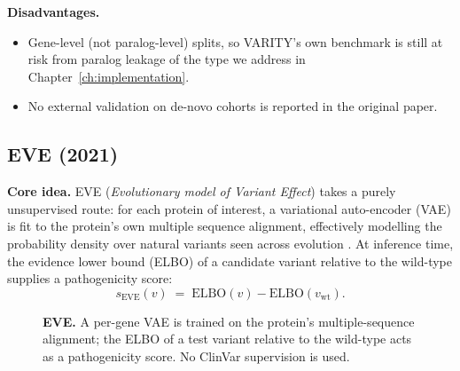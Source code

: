 \documentclass[11pt,a4paper,oneside]{report}
\begin{document}
\textbf{Disadvantages.}
\begin{itemize}[leftmargin=2em, itemsep=0.15em]
  \item Gene-level (not paralog-level) splits, so
    \textsc{VARITY}'s own benchmark is still at risk from
    paralog leakage of the type we address in
    Chapter~\ref{ch:implementation}.
  \item No external validation on de-novo cohorts is
    reported in the original paper.
\end{itemize}

\subsection{EVE (2021) \texorpdfstring{\citep{frazer2021eve}}{(Frazer et al., 2021)}}
\label{sec:rw-eve}

\textbf{Core idea.} EVE (\emph{Evolutionary model of
Variant Effect}) takes a purely unsupervised route:
for each protein of interest, a variational auto-encoder
(VAE) is fit to the protein's own multiple sequence
alignment, effectively modelling the probability density
over natural variants seen across evolution
\citep{frazer2021eve}. At inference time, the evidence
lower bound (ELBO) of a candidate variant relative to
the wild-type supplies a pathogenicity score:
\[
s_{\text{EVE}}(v) \;=\; \mathrm{ELBO}(v) - \mathrm{ELBO}(v_{\text{wt}}).
\]

\begin{figure}[htbp]
\centering
{}
\caption[EVE pipeline]{\textbf{EVE.} A per-gene VAE is trained
on the protein's multiple-sequence alignment; the ELBO of a
test variant relative to the wild-type acts as a pathogenicity
score. No ClinVar supervision is used.}
\label{fig:eve-pipeline}
\end{figure}
\end{document}
